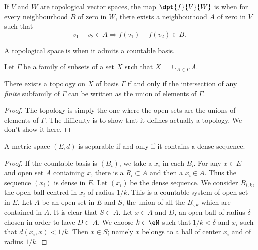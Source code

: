 \begin{definition}

If $V$ and $W$ are topological vector spaces, the map $\dpt{f}{V}{W}$ is  when for every neighbourhood $B$ of zero in $W$, there exists a neighbourhood $A$ of zero in $V$ such that
\[ 
  v_1-v_2\in A\Rightarrow f(v_1)-f(v_2)\in B.
\]
 \label{def:unif_cont}
\end{definition}


\begin{definition}
A topological space is  when it admits a countable basis.
\end{definition}

\begin{lemma}
Let $\Gamma$ be a family of subsets of a set $X$ such that $X=\cup_{A\in\Gamma}A$.

There exists a topology on $X$ of basis $\Gamma$ if and only if the intersection of any \emph{finite} subfamily of $\Gamma$ can be written as the union of elements of $\Gamma$.
\label{lem:topo_base}
\end{lemma}

\begin{proof}
The topology is simply the one where the open sets are the unions of elements of $\Gamma$.  The difficulty is to show that it defines actually a topology. We don't show it here.
\end{proof}

\begin{lemma}
A metric space $(E,d)$ is separable if and only if it contains a dense sequence.
\label{lem:sep_metric}
\end{lemma}

\begin{proof}
 If the countable basis is $(B_i)$, we take a $x_i$ in each $B_i$. For any $x\in E$ and open set $A$ containing $x$, there is a $B_i\subset A$ and then a $x_i\in A$. Thus the sequence $(x_i)$ is dense in $E$.
Let $(x_i)$ be the dense sequence. We consider $B_{i,k}$, the open ball centred in $x_i$ of radius $1/k$. This is a countable system of open set in $E$. Let $A$ be an open set in $E$ and $S$, the union of all the $B_{i,k}$ which are contained in $A$. It is clear that $S\subset A$. Let $x\in A$ and $D$, an open ball of radius $\delta$ chosen in order to have $D\subset A$. We choose $k\in\eN$ such that $1/k<\delta$ and $x_i$ such that $d(x_i,x)<1/k$. Then $x\in S$; namely $x$ belongs to a ball of center $x_i$ and of radius $1/k$.
\end{proof}

